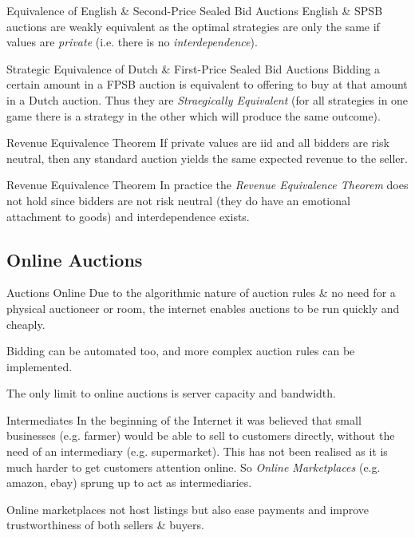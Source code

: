 \documentclass[11pt,a4paper]{article}
\begin{document}
  \begin{remark}{Equivalence of English \& Second-Price Sealed Bid Auctions}
    English \& SPSB auctions are weakly equivalent as the optimal strategies are only the same if values are \textit{private} (i.e. there is no \textit{interdependence}).
  \end{remark}

  \begin{remark}{Strategic Equivalence of Dutch \& First-Price Sealed Bid Auctions}
    Bidding a certain amount in a FPSB auction is equivalent to offering to buy at that amount in a Dutch auction. Thus they are \textit{Straegically Equivalent} (for all strategies in one game there is a strategy in the other which will produce the same outcome).
  \end{remark}

  \begin{theorem}{Revenue Equivalence Theorem}
    If private values are iid and all bidders are risk neutral, then any standard auction yields the same expected revenue to the seller.
  \end{theorem}

  \begin{remark}{Revenue Equivalence Theorem}
    In practice the \textit{Revenue Equivalence Theorem} does not hold since bidders are not risk neutral (they do have an emotional attachment to goods) and interdependence exists.
  \end{remark}

\subsection{Online Auctions}

  \begin{remark}{Auctions Online}
    Due to the algorithmic nature of auction rules \& no need for a physical auctioneer or room, the internet enables auctions to be run quickly and cheaply.
    \par Bidding can be automated too, and more complex auction rules can be implemented.
    \par The only limit to online auctions is server capacity and bandwidth.
  \end{remark}

  \begin{remark}{Intermediates}
    In the beginning of the Internet it was believed that small businesses (e.g. farmer) would be able to sell to customers directly, without the need of an intermediary (e.g. supermarket). This has not been realised as it is much harder to get customers attention online. So \textit{Online Marketplaces} (e.g. amazon, ebay) sprung up to act as intermediaries.
    \par Online marketplaces not host listings but also ease payments and improve trustworthiness of both sellers \& buyers.
  \end{remark}
\end{document}
